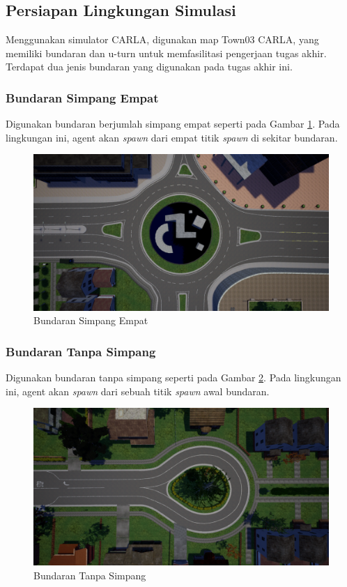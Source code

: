 \documentclass[conference]{IEEEtran}
\begin{document}
\subsection{Persiapan Lingkungan Simulasi}
\label{sec:simulasi}
Menggunakan simulator CARLA, digunakan map Town03 CARLA, yang memiliki bundaran dan u-turn untuk memfasilitasi pengerjaan tugas akhir. Terdapat dua jenis bundaran yang digunakan pada tugas akhir ini.

\subsubsection{Bundaran Simpang Empat}
Digunakan bundaran berjumlah simpang empat seperti pada Gambar  \ref{fig:bundaran_town03}. Pada lingkungan ini, agent akan \textit{spawn }dari empat titik \textit{spawn} di sekitar bundaran.
\begin{figure}[H] 
	\centering
	\includegraphics[width=1\linewidth]{images/bundaran}
	\caption{Bundaran Simpang Empat}
	\label{fig:bundaran_town03}
\end{figure}

\subsubsection{Bundaran Tanpa Simpang}
Digunakan bundaran tanpa simpang seperti pada Gambar  \ref{fig:bundaran_tanpa_simpang}. Pada lingkungan ini, agent akan \textit{spawn }dari sebuah titik \textit{spawn} awal bundaran.
\begin{figure}[H] 
	\centering
	\includegraphics[width=1\linewidth]{images/bundaran_tanpa_simpang}
	\caption{Bundaran Tanpa Simpang}
	\label{fig:bundaran_tanpa_simpang}
\end{figure}
\end{document}
